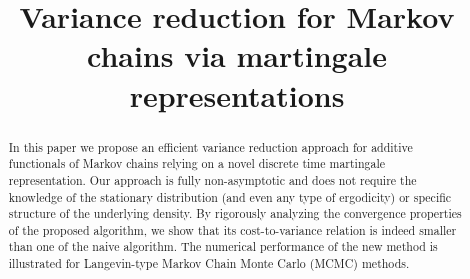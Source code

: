 \documentclass[bj]{imsart}
\begin{document}
\begin{frontmatter}
\title{Variance reduction for Markov chains via martingale representations}



\begin{abstract}
In this paper we propose an efficient variance reduction approach for  additive functionals of Markov chains relying on a novel discrete time martingale representation. Our approach is fully non-asymptotic and does not require the knowledge of the stationary distribution (and even any type of ergodicity) or specific structure of the underlying density.  By rigorously analyzing the  convergence properties of the proposed algorithm, we show that its cost-to-variance relation is indeed  smaller than one of the naive algorithm. The numerical performance of the new method is illustrated for Langevin-type Markov Chain Monte Carlo (MCMC) methods.
\end{abstract}

\begin{keyword}[class=MSC]
\end{keyword}

\begin{keyword}
\end{keyword}

\end{frontmatter}
\end{document}
